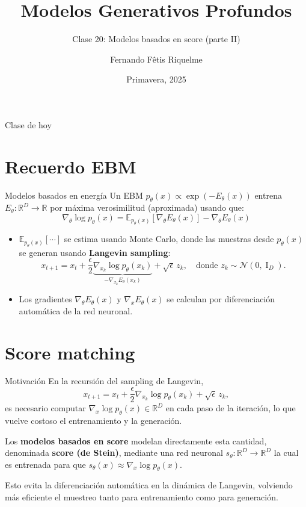 \documentclass{beamer}
\title{Modelos Generativos Profundos}
\subtitle{Clase 20: Modelos basados en score (parte II)}
\author{Fernando Fêtis Riquelme}
\institute{
    Facultad de Ciencias Físicas y Matemáticas\\
    Universidad de Chile
}
\date{Primavera, 2025}
\newcommand{\R}{\mathbb{R}}
\begin{document}
\begin{frame}
    \titlepage
\end{frame}

\begin{frame}{Clase de hoy}
    \tableofcontents
\end{frame}

\section{Recuerdo EBM}

\begin{frame}{Modelos basados en energía}
    Un EBM $p_\theta(x)\propto\exp\left(-E_\theta(x)\right)$ entrena $E_\theta:\R^D\to\R$ por máxima verosimilitud (aproximada) usando que:
    \begin{equation*}
        \nabla_\theta\log p_\theta(x)=\mathbb{E}_{p_\theta(x)}\left[\nabla_\theta E_\theta(x)\right]-\nabla_\theta E_\theta(x)
    \end{equation*}
    \vspace{-0.8cm}
    \begin{itemize}
        \item $\mathbb{E}_{p_\theta(x)}[\cdots]$ se estima usando Monte Carlo, donde las muestras desde $p_\theta(x)$ se generan usando \textbf{Langevin sampling}:
              \begin{equation*}
                  x_{t+1} = x_t+\frac{\epsilon}{2} \underbrace{\nabla_{x_k} \log p_\theta(x_k)}_{-\nabla_{x_k} E_\theta(x_k)}+\sqrt{\epsilon}\, z_k,
                  \quad\text{donde }
                  z_k\sim\mathcal{N}(0,\operatorname{I}_D).
              \end{equation*}
        \item Los gradientes $\nabla_\theta E_\theta(x)$ y $\nabla_x E_\theta(x)$ se calculan por diferenciación automática de la red neuronal.
    \end{itemize}
\end{frame}

\section{Score matching}

\begin{frame}{Motivación}
    En la recursión del sampling de Langevin,
    \begin{equation*}
        x_{t+1} = x_t+\frac{\epsilon}{2} \nabla_{x_k} \log p_\theta(x_k) + \sqrt{\epsilon}\, z_k,
    \end{equation*}
    es necesario computar $\nabla_x \log p_\theta(x)\in\R^D$ en cada paso de la iteración, lo que vuelve costoso el entrenamiento y la generación.

    Los \textbf{modelos basados en score} modelan directamente esta cantidad, denominada \textbf{score (de Stein)}, mediante una red neuronal $s_\theta:\R^D\to\R^D$ la cual es entrenada para que $s_\theta(x)\approx\nabla_x\log p_\theta(x)$.

    Esto evita la diferenciación automática en la dinámica de Langevin, volviendo más eficiente el muestreo tanto para entrenamiento como para generación.
\end{frame}
\end{document}
